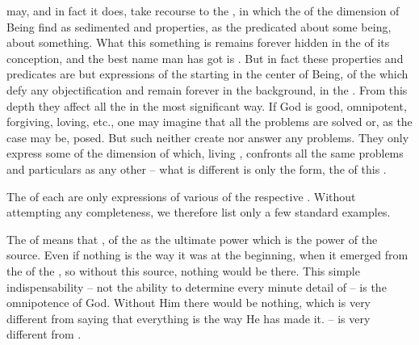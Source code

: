 %
 may, and in fact it does, take recourse to the , in which the  of the  dimension of
Being find  as sedimented and  properties, as
the  predicated about some being, about something. What this
something is remains forever hidden in the  of its conception,
and the best name man has got is .  But in fact these properties and
predicates are but expressions of the  starting in the
 center of Being, of the  which defy any
objectification and remain forever in the background, in the .  From
this  depth they affect all the  in the
most significant way.  If God is good, omnipotent, forgiving, loving, etc., one
may imagine that all the problems are solved or, as the case may be, posed. But
such  neither create nor answer any problems. They only express
some  of the  dimension of  which,
living \Yes, confronts all the same problems and particulars as any other
 -- what is different is only the form, the  of this
.

The  of each  are only expressions of various
 of the respective \nexus. Without attempting any completeness, we
therefore list only a few standard examples.


\label{adhumility} The  of  means
 that ,  of the
 as the ultimate power which is the power of the source.  Even if
nothing  is the way it was at the beginning, when it emerged  from the  of the , so without this
source, nothing would be there. This simple indispensability -- not the
ability to determine every minute detail of  -- is the
omnipotence of God.  Without Him there would be nothing, which is very
different from saying that everything is the way He has made it.
 -- is very different from
.
  
